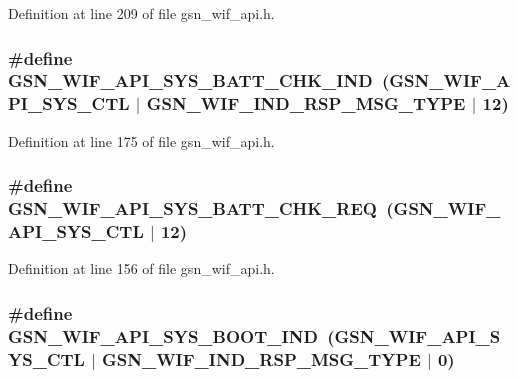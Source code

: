 Definition at line 209 of file gsn\_\-wif\_\-api.h.

\hypertarget{a00606_ab78c1ca62426417801be036f56d808fc}{
\subsubsection[{GSN\_\-WIF\_\-API\_\-SYS\_\-BATT\_\-CHK\_\-IND}]{\setlength{\rightskip}{0pt plus 5cm}\#define GSN\_\-WIF\_\-API\_\-SYS\_\-BATT\_\-CHK\_\-IND~(GSN\_\-WIF\_\-API\_\-SYS\_\-CTL $|$ GSN\_\-WIF\_\-IND\_\-RSP\_\-MSG\_\-TYPE $|$ 12)}}
\label{a00606_ab78c1ca62426417801be036f56d808fc}


Definition at line 175 of file gsn\_\-wif\_\-api.h.

\hypertarget{a00606_a7a2b143bb66de836a2b96e5fb0e35d88}{
\subsubsection[{GSN\_\-WIF\_\-API\_\-SYS\_\-BATT\_\-CHK\_\-REQ}]{\setlength{\rightskip}{0pt plus 5cm}\#define GSN\_\-WIF\_\-API\_\-SYS\_\-BATT\_\-CHK\_\-REQ~(GSN\_\-WIF\_\-API\_\-SYS\_\-CTL $|$ 12)}}
\label{a00606_a7a2b143bb66de836a2b96e5fb0e35d88}


Definition at line 156 of file gsn\_\-wif\_\-api.h.

\hypertarget{a00606_afc607e4455b6d89c4b50f43cb98dc7df}{
\subsubsection[{GSN\_\-WIF\_\-API\_\-SYS\_\-BOOT\_\-IND}]{\setlength{\rightskip}{0pt plus 5cm}\#define GSN\_\-WIF\_\-API\_\-SYS\_\-BOOT\_\-IND~(GSN\_\-WIF\_\-API\_\-SYS\_\-CTL $|$ GSN\_\-WIF\_\-IND\_\-RSP\_\-MSG\_\-TYPE $|$ 0)}}
\label{a00606_afc607e4455b6d89c4b50f43cb98dc7df}


